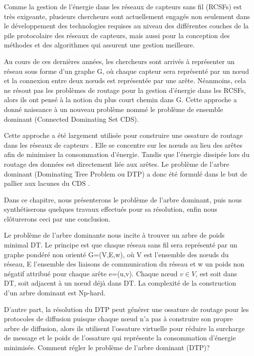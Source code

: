 


Comme la gestion de l’énergie dans les réseaux de capteurs sans fil (RCSFs) est très exigeante, plusieurs chercheurs sont actuellement engagés non seulement dans le développement des technologies requises au niveau des différentes couches de la pile protocolaire des réseaux de capteurs, mais aussi pour la conception des méthodes et des algorithmes qui assurent une gestion meilleure.

Au cours de ces dernières années, les chercheurs sont arrivés à représenter un réseau sous forme d’un graphe G, où chaque capteur sera représenté par un nœud et la connexion entre deux nœuds est représentée par une arête. Néanmoins, cela ne résout pas  les problèmes de routage pour la gestion d’énergie dans les RCSFs, alors ils ont pensé à la notion du plus court chemin dans G.  Cette approche a donné naissance à un nouveau problème nommé le problème de ensemble dominant (Connected Dominating Set CDS).

Cette approche a été largement utilisée pour construire une ossature de routage dans les réseaux de capteurs \cite{thai2008construction,thai2007connected}. Elle se concentre sur les nœuds au lieu des arêtes afin de minimiser la consommation d’énergie. Tandis que l’énergie dissipée lors du routage des données est directement liée aux arêtes.
Le problème de l’arbre dominant (Dominating Tree Problem ou DTP) a donc été formulé dans le but de pallier aux lacunes du CDS \cite{shin2010approximation,zhang2008new} .

Dans ce chapitre, nous présenterons le problème de l’arbre dominant, puis nous synthétiserons quelques travaux effectués pour sa résolution, enfin nous clôturerons ceci par une conclusion.


Le problème de l’arbre dominante nous incite à trouver un arbre de poids minimal DT. Le principe est que chaque réseau sans fil sera représenté par un graphe pondéré non orienté G=(V,E,w), où V est l’ensemble des nœuds du réseau, E l’ensemble des liaisons de communication du réseau et w un poids non négatif attribué pour chaque arête e=(u,v). Chaque nœud $v \in V$, est soit dans DT, soit adjacent à un nœud déjà dans DT. La complexité de la construction d’un arbre dominant est Np-hard.
 
D’autre part, la résolution du DTP peut générer une ossature de routage pour les protocoles de diffusion puisque chaque nœud n’a pas à construire son propre arbre de diffusion, alors ils utilisent l'ossature virtuelle pour réduire la surcharge de message et le poids de l'ossature qui représente la consommation d'énergie minimisée. Comment régler le problème de l’arbre dominant (DTP)? 


